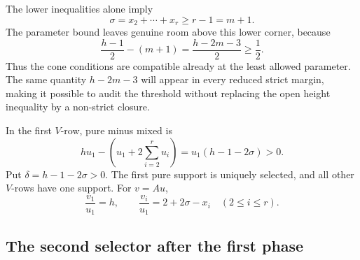 \documentclass[11pt]{article}
\theoremstyle{remark}
\numberwithin{equation}{section}
\begin{document}
The lower inequalities alone imply
\[
\sigma=x_2+\cdots+x_r\geq r-1=m+1.
\]
The parameter bound leaves genuine room above this lower corner, because
\[
\frac{h-1}{2}-(m+1)
=\frac{h-2m-3}{2}\geq\frac12.
\]
Thus the cone conditions are compatible already at the least allowed
parameter.  The same quantity \(h-2m-3\) will appear in every reduced
strict margin, making it possible to audit the threshold without replacing
the open height inequality by a non-strict closure.

In the first \(V\)-row, pure minus mixed is
\begin{equation}\label{eq:first-margin}
hu_1-\left(u_1+2\sum_{i=2}^{r}u_i\right)
=u_1(h-1-2\sigma)>0.
\end{equation}
Put \(\delta=h-1-2\sigma>0\).  The first pure support is uniquely selected,
and all other \(V\)-rows have one support.  For \(v=Au\),
\begin{equation}\label{eq:v-normalized}
\frac{v_1}{u_1}=h,\qquad
\frac{v_i}{u_1}=2+2\sigma-x_i\quad(2\leq i\leq r).
\end{equation}

\subsection{The second selector after the first phase}
\end{document}
